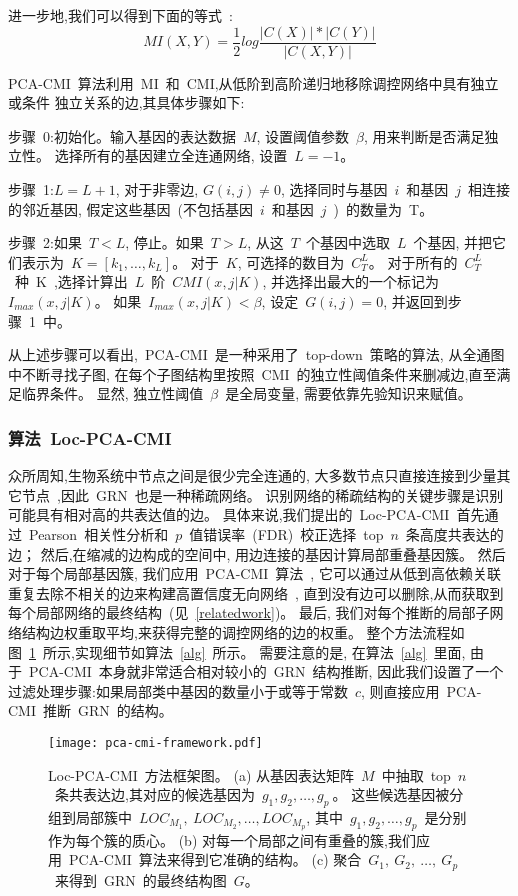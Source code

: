 进一步地,我们可以得到下面的等式~\cite{zhang2011inferring}:
\begin{equation}
    MI(X,Y)=\frac{1}{2}log\frac{|C(X)|*|C(Y)|}{|C(X,Y)|}
\end{equation}

PCA-CMI~算法利用~MI~和~CMI,从低阶到高阶递归地移除调控网络中具有独立或条件
独立关系的边,其具体步骤如下:

步骤~0:初始化。输入基因的表达数据~$M$, 设置阈值参数~$\beta$, 用来判断是否满足独立性。
选择所有的基因建立全连通网络, 设置~$L=-1$。

步骤~1:$L=L+1$, 对于非零边, $G(i,j) \neq 0$, 选择同时与基因~$i$~和基因~$j$~相连接的邻近基因, 
假定这些基因~(不包括基因~$i$~和基因~$j$~)~的数量为~T。

步骤~2:如果~$T<L$, 停止。如果~$T>L$, 从这~$T$~个基因中选取~$L$~个基因, 
并把它们表示为~$K=[k_1,\ldots,k_L]$。
对于~$K$, 可选择的数目为~$C_T^L$。
对于所有的~$C_T^L$~种~K~,选择计算出~$L$~阶~$CMI(x,j|K)$,
并选择出最大的一个标记为~$I_{max}(x,j|K)$。
如果~$I_{max}(x,j|K) < \beta$, 设定~$G(i,j)=0$, 并返回到步骤~1~中。

从上述步骤可以看出,~PCA-CMI~是一种采用了~top-down~策略的算法, 
从全通图中不断寻找子图, 在每个子图结构里按照~CMI~的独立性阈值条件来删减边,直至满足临界条件。
显然, 独立性阈值~$\beta$~是全局变量, 
需要依靠先验知识来赋值。

\subsubsection{算法~Loc-PCA-CMI}

众所周知,生物系统中节点之间是很少完全连通的,
大多数节点只直接连接到少量其它节点~\cite{jeong2000large},因此~GRN~也是一种稀疏网络。
识别网络的稀疏结构的关键步骤是识别可能具有相对高的共表达值的边。
具体来说,我们提出的~Loc-PCA-CMI~首先通过~Pearson~相关性分析和~$p$~值错误率~(FDR)~校正选择~top~$n$~条高度共表达的边；
然后,在缩减的边构成的空间中, 用边连接的基因计算局部重叠基因簇。
然后对于每个局部基因簇, 我们应用~PCA-CMI~算法~\cite{zhang2011inferring},
它可以通过从低到高依赖关联重复去除不相关的边来构建高置信度无向网络~\cite{spirtes2000causation},
直到没有边可以删除,从而获取到每个局部网络的最终结构~(见~\ref{relatedwork})。
最后, 我们对每个推断的局部子网络结构边权重取平均,来获得完整的调控网络的边的权重。
整个方法流程如图~\ref{pca-cmi-fr}~所示,实现细节如算法~\ref{alg}~所示。
需要注意的是,
在算法~\ref{alg}~里面,
由于~PCA-CMI~本身就非常适合相对较小的~GRN~结构推断,
因此我们设置了一个过滤处理步骤:如果局部类中基因的数量小于或等于常数~$c$,
则直接应用~PCA-CMI~推断~GRN~的结构。
\begin{figure}[!htbp]
    \centering
    \texttt{[image: pca-cmi-framework.pdf]}
    \caption{Loc-PCA-CMI~方法框架图。
    (a) 从基因表达矩阵~$M$~中抽取~top~$n$~条共表达边,其对应的候选基因为~$g_1,g_2,\ldots,g_{p}~$。
    这些候选基因被分组到局部簇中~$LOC_{M_1},~LOC_{M_2},\ldots,LOC_{M_{p}}$,
    其中~$g_1,g_2,\ldots,g_{p}$~是分别作为每个簇的质心。
    (b) 对每一个局部之间有重叠的簇,我们应用~PCA-CMI~算法来得到它准确的结构。
    (c) 聚合~$G_1,~G_2,~\ldots,~G_p$~来得到~GRN~的最终结构图~$G$。
    }
    \label{pca-cmi-fr}
\end{figure}

